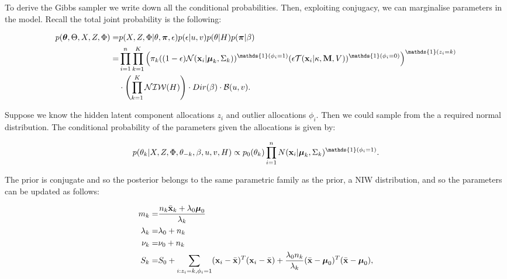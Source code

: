 \documentclass[12pt,english]{article}\usepackage[]{graphicx}\usepackage[]{color}
\begin{document}
To derive the Gibbs sampler we write down all the conditional
probabilities. Then, exploiting conjugacy, we can marginalise
parameters in the model. Recall the total joint probability is the
following:

\begin{equation}
\begin{split}
p(\boldsymbol{\theta},\Theta, X, Z, \Phi)  = &p(X,Z,\Phi|\theta,\boldsymbol{\pi}, \epsilon)p(\epsilon|u,v)p(\theta|H)p(\boldsymbol{\pi}|\beta)\\
=  & \prod_{i=1}^{n}\prod_{k=1}^{K}\left(\pi_k((1-\epsilon) \mathcal{N}({\bf x}_i|\boldsymbol{\mu}_k, \Sigma_k))^{\mathds{1}(\phi_i = 1)}(\epsilon \mathcal{T}({\bf x}_i|\kappa, {\bf M}, V))^{\mathds{1}(\phi_i = 0)}\right)^{\mathds{1}(z_i=k)}\\
&\cdot \left(\prod_{k=1}^{K}\mathcal{NIW}(H)\right)\cdot Dir(\beta)\cdot \mathcal{B}(u,v). \end{split}
\end{equation}

Suppose we know the hidden latent component allocations $z_i$ and
outlier allocations $\phi_i$. Then we could sample from the a required
normal distribution. The conditional probability of the parameters
given the allocations is given by:

\begin{equation}
\begin{split}
p(\theta_k|X,Z,\Phi, \theta_{-k}, \beta, u,v, H) \propto p_0(\theta_{k})\prod_{i=1}^{n}N({\bf x}_i |\boldsymbol{\mu}_k, \Sigma_k)^{\mathds{1}(\phi_i = 1)}.
\end{split}
\end{equation}

The prior is conjugate and so the posterior belongs to the same
parametric family as the prior, a NIW distribution, and so the
parameters can be updated as follows:

\begin{equation}
\begin{split}
m_k = & \frac{n_k\bar{{\bf x}}_k + \lambda_0 \boldsymbol{\mu}_0}{\lambda_k}\\
\lambda_k = & \lambda_0 + n_k\\
\nu_k = & \nu_0 + n_k \\
S_k = & S_0 + \sum_{i:z_i = k, \phi_i = 1}({\bf x}_i - \bar{{\bf x}})^{T}({\bf x}_i - \bar{{\bf x}}) + \frac{\lambda_0n_k}{\lambda_k}(\bar{{\bf x}}- \boldsymbol{\mu}_0)^T(\bar{{\bf x}} - \boldsymbol{\mu}_0), \\
\end{split}
\end{equation}
\end{document}
